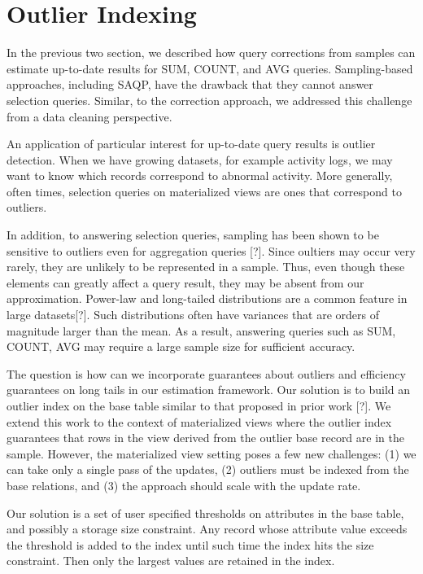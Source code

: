 \section{Outlier Indexing}\label{outlier}
In the previous two section, we described how query corrections from samples 
can estimate up-to-date results for SUM, COUNT, and AVG queries.
Sampling-based approaches, including SAQP, have the drawback that they cannot answer selection queries.
Similar, to the correction approach, we addressed this challenge from a data cleaning perspective.

An application of particular interest for up-to-date query results is outlier detection. 
When we have growing datasets, for example activity logs, we may want to know which records correspond to abnormal activity.
More generally, often times, selection queries on materialized views are ones that correspond to outliers.

In addition, to answering selection queries, sampling has been shown to be sensitive to outliers even for aggregation queries [?].
Since oultiers may occur very rarely, they are unlikely to be represented in a sample.
Thus, even though these elements can greatly affect a query result, they may be absent from our approximation.
Power-law and long-tailed distributions are a common feature in large datasets[?].
Such distributions often have variances that are orders of magnitude larger
than the mean.
As a result, answering queries such as SUM, COUNT, AVG may require a large 
sample size for sufficient accuracy.

The question is how can we incorporate guarantees about outliers
and efficiency guarantees on long tails in our estimation framework.
Our solution is to build an outlier index on the base table similar to that proposed in prior work [?].
We extend this work to the context of materialized views where the outlier index guarantees
that rows in the view derived from the outlier base record are in the sample.
However, the materialized view setting poses a few new challenges: (1) we can take only
a single pass of the updates, (2) outliers must be indexed from the base relations, and
(3) the approach should scale with the update rate.

Our solution is a set of user specified thresholds on attributes in the base table, and possibly a storage size constraint.
Any record whose attribute value exceeds the threshold is added to the index until such time the index hits the size constraint.
Then only the largest values are retained in the index.

